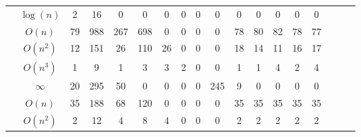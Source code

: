 \begin{table}[ht]
{\begin{tabular}{ | >{\scriptsize}c | >{\scriptsize}c | >{\scriptsize}c | >{\scriptsize}c | >{\scriptsize}c | c | c | c | c | c | c | c | c | c | c | c | c | c |}
    \cline{2-2}
    & $\log(n)$ & 2 & 16 & 0 & 0 & 0 & 0 & 0 & 0 & 0 & 0 & 0 & 0 & 0   \\
    \cline{2-2}
    & $O(n)$ & 79 & 988 & 267 & 698 & 0 & 0 & 0 & 0 & 78 & 80 & 82 & 78 & 77  \\
    \cline{2-2}
    & $O(n^2)$ & 12 & 151 & 26 & 110 & 26 & 0 & 0 & 0 & 18 & 14 & 11 & 16 & 17  \\
    \cline{2-2}
    & $O(n^3)$ & 1 &  9 & 1 & 3 & 3 & 2 & 0 & 0 & 1 & 1 & 4 & 2 & 4  \\
    \cline{2-2}
    & $\infty$ & 20 & 295 &  50 & 0 & 0 & 0 & 0 & 245 & 9 & 0 & 0 & 0 & 0  \\
    \hline \hline
    \multirow{2}{*}{Tianhan} 
    & $O(n)$ & 35 & 188 & 68 & 120 & 0 & 0 & 0 & 0 & 35 & 35 & 35 & 35 & 35  \\
    \cline{2-2}
    & $O(n^2)$ & 2 & 12 & 4 & 8 & 4 & 0 & 0 & 0 & 2 & 2 & 2 & 2 & 2   \\
    \hline
    \hline
    \end{tabular}
    }
    \vspace{-0.3cm}    
    \end{table}
